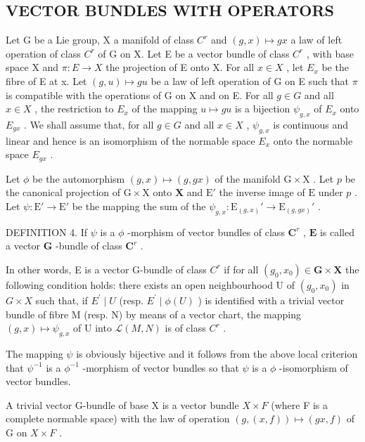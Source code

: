\subsection{VECTOR BUNDLES WITH OPERATORS}

Let G be a Lie group, X a manifold of class \(C^{r}\) and \((g, x) \mapsto gx\) a law of left operation of class \(C^{r}\) of G on X. Let E be a vector bundle of class \(C^{r}\) , with base space X and \(\pi: E \to X\) the projection of E onto X. For all \(x \in X\) , let \(E_{x}\) be the fibre of E at x. Let \((g, u) \mapsto gu\) be a law of left operation of G on E such that \(\pi\) is compatible with the operations of G on X and on E. For all \(g \in G\) and all \(x \in X\) , the restriction to \(E_{x}\) of the mapping \(u \mapsto gu\) is a bijection \(\psi_{g,x}\) of \(E_{x}\) onto \(E_{gx}\) . We shall assume that, for all \(g \in G\) and all \(x \in X\) , \(\psi_{g,x}\) is continuous and linear and hence is an isomorphism of the normable space \(E_{x}\) onto the normable space \(E_{gx}\) .

Let \(\phi\) be the automorphism \((g,x)\mapsto (g,gx)\) of the manifold \(\mathrm{G}\times \mathrm{X}\) . Let \(p\) be the canonical projection of \(\mathrm{G}\times \mathrm{X}\) onto \(\mathbf{X}\) and \(\mathrm{E}'\) the inverse image of \(\mathrm{E}\) under \(p\) . Let \(\psi \colon \mathrm{E}'\to \mathrm{E}'\) be the mapping the sum of the \(\psi_{g,x}\colon \mathrm{E}_{(g,x)}'\to \mathrm{E}_{(g,gx)}'\) .

DEFINITION 4. If \(\psi\) is a \(\phi\) -morphism of vector bundles of class \(\mathbf{C}^r\) , \(\mathbf{E}\) is called a vector \(\mathbf{G}\) -bundle of class \(\mathbf{C}^r\) .

In other words, E is a vector G-bundle of class \(C^{r}\) if for all \((g_{0}, x_{0}) \in \mathbf{G} \times \mathbf{X}\) the following condition holds: there exists an open neighbourhood U of \((g_{0}, x_{0})\) in \(G \times X\) such that, if \(E^{\prime} \mid U\) (resp. \(E^{\prime} \mid \phi(U)\) ) is identified with a trivial vector bundle of fibre M (resp. N) by means of a vector chart, the mapping \((g, x) \mapsto \psi_{g,x}\) of U into \(\mathcal{L}(M, N)\) is of class \(C^{r}\) .

The mapping \(\psi\) is obviously bijective and it follows from the above local criterion that \(\psi^{-1}\) is a \(\phi^{-1}\) -morphism of vector bundles so that \(\psi\) is a \(\phi\) -isomorphism of vector bundles.

A trivial vector G-bundle of base X is a vector bundle \(X \times F\) (where F is a complete normable space) with the law of operation \((g, (x, f)) \mapsto (gx, f)\) of G on \(X \times F\) .

